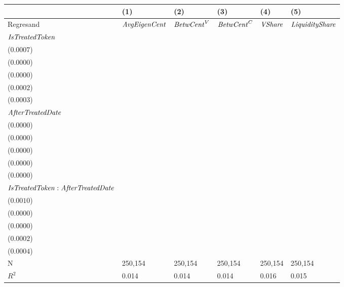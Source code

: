 \begin{tabular}{llllll}
\toprule
{} &                                      (1) &                                       (2) &                                       (3) &                                      (4) &                                       (5) \\
\midrule
Regresand                                     &                     ${\it AvgEigenCent}$ &                        ${\it BetwCent}^V$ &                        ${\it BetwCent}^C$ &                           ${\it VShare}$ &                    ${\it LiquidityShare}$ \\
${\it IsTreatedToken}$                        &  \makecell{$0.0138^{***}$ \\ ($0.0007$)} &   \makecell{$0.0003^{***}$ \\ ($0.0000$)} &   \makecell{$0.0001^{***}$ \\ ($0.0000$)} &  \makecell{$0.0037^{***}$ \\ ($0.0002$)} &   \makecell{$0.0093^{***}$ \\ ($0.0003$)} \\
${\it AfterTreatedDate}$                      &  \makecell{$0.0020^{***}$ \\ ($0.0000$)} &   \makecell{$0.0000^{***}$ \\ ($0.0000$)} &   \makecell{$0.0000^{***}$ \\ ($0.0000$)} &  \makecell{$0.0005^{***}$ \\ ($0.0000$)} &   \makecell{$0.0008^{***}$ \\ ($0.0000$)} \\
${\it IsTreatedToken}:{\it AfterTreatedDate}$ &  \makecell{$0.0046^{***}$ \\ ($0.0010$)} &  \makecell{$-0.0000^{***}$ \\ ($0.0000$)} &  \makecell{$-0.0000^{***}$ \\ ($0.0000$)} &  \makecell{$0.0012^{***}$ \\ ($0.0002$)} &  \makecell{$-0.0024^{***}$ \\ ($0.0004$)} \\
\midrule N                                    &                                  250,154 &                                   250,154 &                                   250,154 &                                  250,154 &                                   250,154 \\
$R^2$                                         &                                    0.014 &                                     0.014 &                                     0.014 &                                    0.016 &                                     0.015 \\
\bottomrule
\end{tabular}
